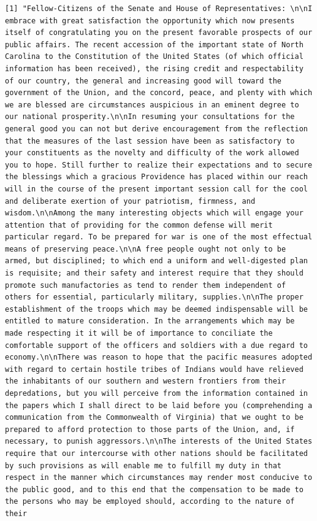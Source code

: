 \documentclass[
  letterpaper,
  DIV=11,
  numbers=noendperiod]{scrreprt}
\newenvironment{Shaded}{\begin{snugshade}}{\end{snugshade}}
\newcommand{\DecValTok}[1]{\textcolor[rgb]{0.68,0.00,0.00}{#1}}
\newcommand{\DocumentationTok}[1]{\textcolor[rgb]{0.37,0.37,0.37}{\textit{#1}}}
\newcommand{\NormalTok}[1]{\textcolor[rgb]{0.00,0.23,0.31}{#1}}
\newcommand{\SpecialCharTok}[1]{\textcolor[rgb]{0.37,0.37,0.37}{#1}}
\begin{document}
\begin{Shaded}
\end{Shaded}

\begin{verbatim}
[1] "Fellow-Citizens of the Senate and House of Representatives: \n\nI embrace with great satisfaction the opportunity which now presents itself of congratulating you on the present favorable prospects of our public affairs. The recent accession of the important state of North Carolina to the Constitution of the United States (of which official information has been received), the rising credit and respectability of our country, the general and increasing good will toward the government of the Union, and the concord, peace, and plenty with which we are blessed are circumstances auspicious in an eminent degree to our national prosperity.\n\nIn resuming your consultations for the general good you can not but derive encouragement from the reflection that the measures of the last session have been as satisfactory to your constituents as the novelty and difficulty of the work allowed you to hope. Still further to realize their expectations and to secure the blessings which a gracious Providence has placed within our reach will in the course of the present important session call for the cool and deliberate exertion of your patriotism, firmness, and wisdom.\n\nAmong the many interesting objects which will engage your attention that of providing for the common defense will merit particular regard. To be prepared for war is one of the most effectual means of preserving peace.\n\nA free people ought not only to be armed, but disciplined; to which end a uniform and well-digested plan is requisite; and their safety and interest require that they should promote such manufactories as tend to render them independent of others for essential, particularly military, supplies.\n\nThe proper establishment of the troops which may be deemed indispensable will be entitled to mature consideration. In the arrangements which may be made respecting it it will be of importance to conciliate the comfortable support of the officers and soldiers with a due regard to economy.\n\nThere was reason to hope that the pacific measures adopted with regard to certain hostile tribes of Indians would have relieved the inhabitants of our southern and western frontiers from their depredations, but you will perceive from the information contained in the papers which I shall direct to be laid before you (comprehending a communication from the Commonwealth of Virginia) that we ought to be prepared to afford protection to those parts of the Union, and, if necessary, to punish aggressors.\n\nThe interests of the United States require that our intercourse with other nations should be facilitated by such provisions as will enable me to fulfill my duty in that respect in the manner which circumstances may render most conducive to the public good, and to this end that the compensation to be made to the persons who may be employed should, according to the nature of their 
\end{verbatim}
\end{document}
